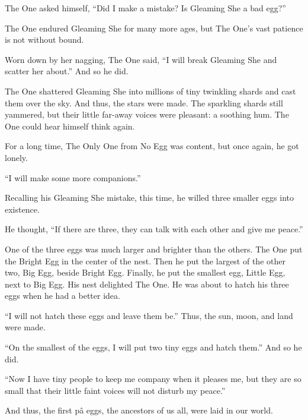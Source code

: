 The One asked himself, ``Did I make a mistake? Is Gleaming She a bad
egg?''

The One endured Gleaming She for many more ages, but The One's vast
patience is not without bound.

Worn down by her nagging, The One said, ``I will break Gleaming She and
scatter her about.'' And so he did.

The One shattered Gleaming She into millions of tiny twinkling shards
and cast them over the sky. And thus, the stars were made. The sparkling
shards still yammered, but their little far-away voices were pleasant: a
soothing hum. The One could hear himself think again.

For a long time, The Only One from No Egg was content, but once again,
he got lonely.

``I will make some more companions.''

Recalling his Gleaming She mistake, this time, he willed three smaller
eggs into existence.

He thought, ``If there are three, they can talk with each other and give
me peace.''

One of the three eggs was much larger and brighter than the others. The
One put the Bright Egg in the center of the nest. Then he put the
largest of the other two, Big Egg, beside Bright Egg. Finally, he put
the smallest egg, Little Egg, next to Big Egg. His nest delighted The
One. He was about to hatch his three eggs when he had a better idea.

``I will not hatch these eggs and leave them be.'' Thus, the sun, moon,
and land were made.

``On the smallest of the eggs, I will put two tiny eggs and hatch
them.'' And so he did.

``Now I have tiny people to keep me company when it pleases me, but they
are so small that their little faint voices will not disturb my peace.''

And thus, the first pâ eggs, the ancestors of us all, were laid in our
world.



%
